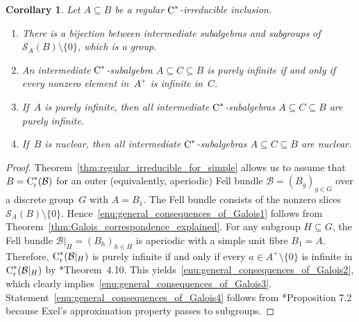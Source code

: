 \documentclass[a4paper]{amsart}
\theoremstyle{plain}
\newtheorem{corollary}[theorem]{Corollary}
\theoremstyle{definition}
\theoremstyle{remark}
\numberwithin{theorem}{section}
\numberwithin{equation}{section}
\newcommand*{\nb}{\nobreakdash}
\newcommand*{\red}{\mathrm{r}}%
\newcommand*{\Cst}{\textup C^*}%
\newcommand*{\Slice}{\mathcal S}%
\newcommand*{\B}{\mathcal B}%
\begin{document}
\begin{corollary}
  \label{cor:general_consequences_of_Galois}
  Let \(A\subseteq B\) be a regular \(\Cst\)\nb-irreducible inclusion.
  \begin{enumerate}
  \item \label{enu:general_consequences_of_Galois1}%
    There is a bijection between intermediate subalgebras and
    subgroups of \(\Slice_A(B)\setminus\{0\}\), which is a group.
  \item \label{enu:general_consequences_of_Galois2}%
    An intermediate \(\Cst\)\nb-subalgebra \(A\subseteq C \subseteq B\) is purely infinite
    if and only if every nonzero element in~\(A^+\) is infinite in~\(C\).
  \item \label{enu:general_consequences_of_Galois3}%
    If~\(A\)  is purely infinite, then all intermediate
    \(\Cst\)\nb-subalgebras \(A\subseteq C \subseteq B\) are purely
    infinite.
  \item \label{enu:general_consequences_of_Galois4}%
    If~\(B\) is nuclear, then all intermediate \(\Cst\)\nb-subalgebras
    \(A\subseteq C \subseteq B\) are nuclear.
  \end{enumerate}
\end{corollary}

\begin{proof}
  Theorem~\ref{thm:regular_irreducible_for_simple} allows us to assume
  that \(B=\Cst_\red(\B)\) for an outer (equivalently, aperiodic) Fell
  bundle \(\B=(B_g)_{g\in G}\) over a discrete group~\(G\)  with
  \(A=B_1\).
  The Fell bundle consists of the nonzero slices
  \(\Slice_A(B)\setminus\{0\}\).
  Hence~\ref{enu:general_consequences_of_Galois1} follows from
  Theorem~\ref{thm:Galois_correspondence_explained}.
  For any subgroup \(H\subseteq G\), the Fell bundle
  \(\B|_H=(B_h)_{h\in H}\) is aperiodic with a simple unit fibre
  \(B_1=A\).
  Therefore, \(\Cst_\red(\B|_H)\) is purely infinite if and only if
  every \(a\in A^+\setminus\{0\}\) is infinite in \(\Cst_\red(\B|_H)\)
  by \cite{Kwasniewski-Szymanski:Pure_infinite}*{Theorem~4.10}.
  This yields~\ref{enu:general_consequences_of_Galois2}, which clearly
  implies~\ref{enu:general_consequences_of_Galois3}.
  Statement~\ref{enu:general_consequences_of_Galois4} follows from
  \cite{Abadie-Buss-Ferraro:Amenability}*{Proposition 7.2} because
  Exel's approximation property passes to subgroups.
\end{proof}
\end{document}

